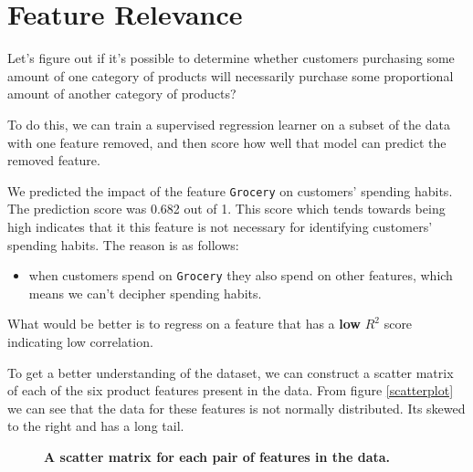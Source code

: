 \documentclass[twoside,openright,titlepage,numbers=noenddot,headinclude,%
               footinclude=true,cleardoublepage=empty,abstractoff,BCOR=5mm,%
               paper=a4,fontsize=11pt,ngerman,american]{scrreprt}
\numberwithin{theorem}{chapter}
\numberwithin{definition}{chapter}
\numberwithin{algorithm}{chapter}
\numberwithin{figure}{chapter}
\numberwithin{table}{chapter}
\numberwithin{equation}{chapter}
\begin{document}
\section*{Feature Relevance}
Let's figure out if it's possible to determine whether customers purchasing some amount of one category of products will necessarily purchase some proportional amount of another category of products? 

To do this, we can train a supervised regression learner on a subset of the data with one feature removed, and then score how well that model can predict the removed feature.

We predicted the impact of the feature \texttt{Grocery} on customers' spending habits. The prediction score was 0.682 out of 1. This score which tends towards being high indicates that it this feature is not necessary for identifying customers' spending habits. The reason is as follows: 
\begin {itemize}
\item when customers spend on \texttt{Grocery} they also spend on other features, which means we can't decipher spending habits. 
\end{itemize}
What would be better is to regress on a feature that has a \textbf{low} $R^2$ score indicating low correlation.


To get a better understanding of the dataset, we can construct a scatter matrix of each of the six product features present in the data. From figure \ref{scatterplot} we can see that the data for these features is not normally distributed. Its skewed to the right and has a long tail.
\begin{figure}[!hbtp]
\centering
    
    \caption{\textbf{A scatter matrix for each pair of features in the data. }}
\end{figure}
\end{document}

